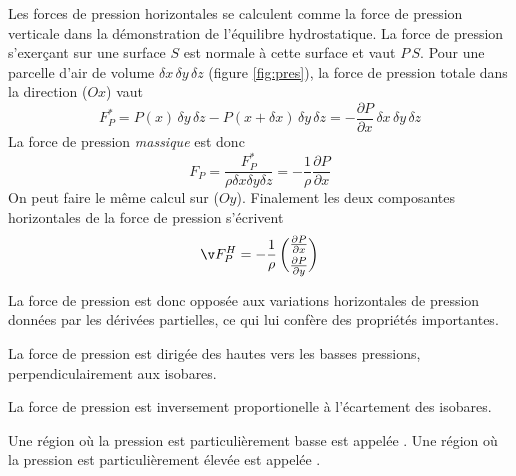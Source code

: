 \sk
Les forces de pression horizontales se calculent comme la force de pression verticale dans la démonstration de l'équilibre hydrostatique. La force de pression s'exerçant sur une surface $S$ est normale à cette surface et vaut $P \, S$. Pour une parcelle d'air de volume $\delta x \, \delta y \, \delta z$ (figure \ref{fig:pres}), la force de pression totale dans la direction ($Ox$) vaut
\[ F_P^* = P(x) \, \delta y \, \delta z - P(x+\delta x) \, \delta y \, \delta z = - \frac{\partial P}{\partial x} \, \delta x \, \delta y \, \delta z \]
La force de pression {\em massique} est donc
\[F_P = \frac{F_P^*}{\rho \delta x \delta y \delta z}=-\frac{1}{\rho}\frac{\partial P}{\partial x}\]
On peut faire le même calcul sur ($Oy$). Finalement les deux composantes horizontales de la force de pression s'écrivent
\[\v F_P^H = -\frac{1}{\rho} \, \binom{\frac{\partial P}{\partial x}}{\frac{\partial P}{\partial y}}\] %

\sk
La force de pression est donc opposée aux variations horizontales de pression données par les dérivées partielles, ce qui lui confère des propriétés importantes.
\begin{citemize}
\item La force de pression est dirigée des hautes vers les basses pressions, perpendiculairement aux isobares.
\item La force de pression est inversement proportionelle à l'écartement des isobares.
\end{citemize}
Une région où la pression est particulièrement basse est appelée . Une région où la pression est particulièrement élevée est appelée .


